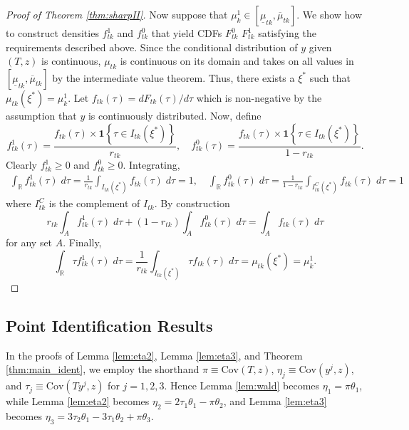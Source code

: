 \begin{proof}[Proof of Theorem \ref{thm:sharpII}]
Now suppose that $\mu^1_{k} \in \left[\underline{\mu}_{tk}, \overline{\mu}_{tk} \right]$.
We show how to construct densities $f_{tk}^1$ and $f_{tk}^0$ that yield CDFs $F_{tk}^0$ $F_{tk}^1$ satisfying the requirements described above.
Since the conditional distribution of $y$ given $(T,z)$ is continuous, $\mu_{tk}$ is continuous on its domain and takes on all values in $\left[ \underline{\mu}_{tk}, \overline{\mu}_{tk} \right]$ by the intermediate value theorem.
Thus, there exists a $\xi^*$ such that $\mu_{tk}(\xi^*) = \mu^1_{k}$.
Let $f_{tk}(\tau) = dF_{tk}(\tau)/d\tau$ which is non-negative by the assumption that $y$ is continuously distributed.
Now, define
\[
  f^1_{tk}(\tau) = \frac{f_{tk}(\tau)\times \mathbf{1}\left\{ \tau \in I_{tk}(\xi^*) \right\}}{r_{tk}}, \quad
  f^0_{tk}(\tau) = \frac{f_{tk}(\tau) \times \mathbf{1}\left\{ \tau \in I_{tk}(\xi^*) \right\}}{1 - r_{tk}}.
\]
Clearly $f_{tk}^1\geq 0$ and $f^0_{tk} \geq 0$.
Integrating, 
\begin{align*}
  \int_{\mathbb{R}} f_{tk}^1(\tau) \; d\tau = \frac{1}{r_{tk}}\int_{I_{tk}(\xi^*)} f_{tk}(\tau)\; d\tau = 1, \quad
  \int_{\mathbb{R}} f_{tk}^0(\tau) \; d\tau = \frac{1}{1 - r_{tk}}\int_{I^C_{tk}(\xi^*)} f_{tk}(\tau)\; d\tau = 1
\end{align*}
where $I_{tk}^C$ is the complement of $I_{tk}$.
By construction
\[
  r_{tk} \int_A f_{tk}^1(\tau) \; d\tau + (1 - r_{tk}) \int_A f_{tk}^0(\tau) \; d\tau = \int_A f_{tk}(\tau)\; d\tau
\]
for any set $A$. 
Finally,
\[
  \int_{\mathbb{R}} \tau f_{tk}^1(\tau) \; d\tau = \frac{1}{r_{tk}} \int_{I_{tk}(\xi^*)} \tau f_{tk}(\tau)\; d\tau = \mu_{tk}(\xi^*) = \mu^1_{k}.
\]
\end{proof}

\subsection{Point Identification Results}
In the proofs of Lemma \ref{lem:eta2}, Lemma \ref{lem:eta3}, and Theorem \ref{thm:main_ident}, we employ the shorthand $\pi \equiv \mbox{Cov}(T,z)$, $\eta_j \equiv \mbox{Cov}(y^j,z)$, and $\tau_j \equiv \mbox{Cov}(Ty^j,z)$ for $j = 1, 2, 3$.
Hence Lemma \ref{lem:wald} becomes $\eta_1 = \pi\theta_1$, while Lemma \ref{lem:eta2} becomes $\eta_2 =  2\tau_1 \theta_1 - \pi \theta_2$, 
and Lemma \ref{lem:eta3} becomes $\eta_3 = 3\tau_2 \theta_1 - 3\tau_1 \theta_2 + \pi\theta_3$.

